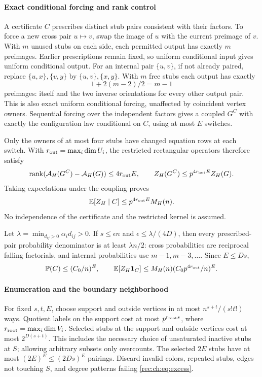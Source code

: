 \documentclass[11pt]{article}
\theoremstyle{definition}
\theoremstyle{remark}
\newcommand{\E}{\mathbb E}
\newcommand{\1}{\mathbf 1}
\providecommand{\one}{\mathbf 1}
\providecommand{\Prob}{\mathbb P}
\providecommand{\rank}{\operatorname{rank}}
\begin{document}
\paragraph{Exact conditional forcing and rank control}
A certificate $C$ prescribes distinct stub pairs consistent with their factors. To force a new cross pair $u\mapsto v$, swap the image of $u$ with the current preimage of $v$. With $m$ unused stubs on each side, each permitted output has exactly $m$ preimages. Earlier prescriptions remain fixed, so uniform conditional input gives uniform conditional output. For an internal pair $\{u,v\}$, if not already paired, replace $\{u,x\},\{v,y\}$ by $\{u,v\},\{x,y\}$. With $m$ free stubs each output has exactly
\[
 1+2(m-2)/2=m-1
\]
preimages: itself and the two inverse orientations for every other output pair. This is also exact uniform conditional forcing, unaffected by coincident vertex owners. Sequential forcing over the independent factors gives a coupled $G^C$ with exactly the configuration law conditional on $C$, using at most $E$ switches.

Only the owners of at most four stubs have changed equation rows at each switch. With $r_{\rm out}=\max_i\dim U_i$, the restricted rectangular operators therefore satisfy
\[
 \rank(\mathcal A_H(G^C)-\mathcal A_H(G))\le4r_{\rm out}E,
 \qquad Z_H(G^C)\le p^{4r_{\rm out}E}Z_H(G).
\]
Taking expectations under the coupling proves
\begin{equation}\label{rec:ch:eq:conditional}
 \E[Z_H\mid C]\le p^{4r_{\rm out}E}M_H(n).
\end{equation}
No independence of the certificate and the restricted kernel is assumed.

Let $\lambda=\min_{d_{ij}>0}\alpha_id_{ij}>0$. If $s\le\epsilon n$ and $\epsilon\le\lambda/(4D)$, then every prescribed-pair probability denominator is at least $\lambda n/2$: cross probabilities are reciprocal falling factorials, and internal probabilities use $m-1,m-3,\ldots$. Since $E\le Ds$,
\begin{equation}\label{rec:ch:eq:weighted}
 \Prob(C)\le(C_0/n)^E,\qquad
 \E[Z_H\one_C]\le M_H(n)(C_0p^{4r_{\rm out}}/n)^E.
\end{equation}

\paragraph{Enumeration and the boundary neighborhood}
For fixed $s,t,E$, choose support and outside vertices in at most $n^{s+t}/(s!t!)$ ways. Quotient labels on the support cost at most $p^{r_{\rm root}s}$, where $r_{\rm root}=\max_i\dim V_i$. Selected stubs at the support and outside vertices cost at most $2^{D(s+t)}$. This includes the necessary choice of unsaturated inactive stubs at $S$; allowing arbitrary subsets only overcounts. The selected $2E$ stubs have at most $(2E)^E\le(2Ds)^E$ pairings. Discard invalid colors, repeated stubs, edges not touching $S$, and degree patterns failing \eqref{rec:ch:eq:excess}.
\end{document}
